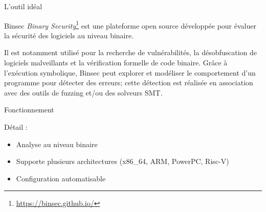 \documentclass{backend/backend}
\begin{document}
\begin{frame}{L'outil idéal}
    \begin{exampleblock}{Binsec \cite{binsecRel2019}}
       \textit{Binary Security}\footnote{\url{https://binsec.github.io/}} est une plateforme open source développée pour évaluer la sécurité des logiciels au niveau binaire. 
       
       Il est notamment utilisé pour la recherche de vulnérabilités, la désobfuscation de logiciels malveillants et la vérification formelle de code binaire. Grâce à l'exécution symbolique, Binsec peut explorer et modéliser le comportement d'un programme pour détecter des erreurs; cette détection est réalisée en association avec des outils de fuzzing et/ou des solveurs SMT.
    \end{exampleblock}
\end{frame}


\begin{frame}{Fonctionnement}

    \begin{blockSimple}{Détail :}
        \begin{itemize}
            \item Analyse au niveau binaire
            \item Supporte plusieurs architectures (x86\_64, ARM, PowerPC, Risc-V)
            \item Configuration automatisable
        \end{itemize}
    \end{blockSimple}
    \centering
    
\end{frame}
\end{document}

